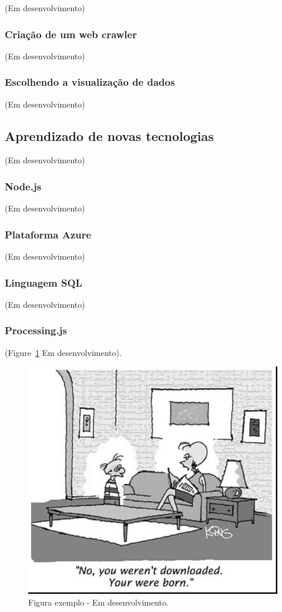 \documentclass[12pt]{article}
\begin{document}
(Em desenvolvimento)

\subsubsection{Criação de um web crawler}

(Em desenvolvimento)

\subsubsection{Escolhendo a visualização de dados}

(Em desenvolvimento)

\subsection{Aprendizado de novas tecnologias}

(Em desenvolvimento)

\subsubsection{Node.js}

(Em desenvolvimento)

\subsubsection{Plataforma Azure}

(Em desenvolvimento)

\subsubsection{Linguagem SQL}

(Em desenvolvimento)

\subsubsection{Processing.js}

(Figure~\ref{fig:exampleFig1} Em desenvolvimento).

\begin{figure}[ht]
\centering
\includegraphics[width=.5\textwidth]{fig1.jpg}
\caption{Figura exemplo - Em desenvolvimento.}
\label{fig:exampleFig1}
\end{figure}
\end{document}
